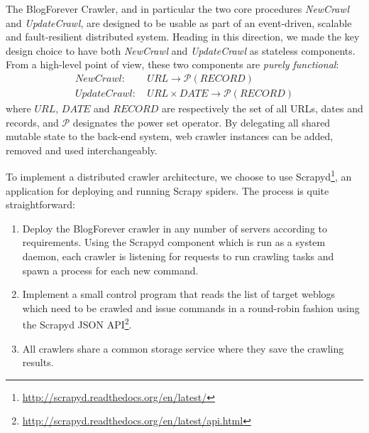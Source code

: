 The BlogForever Crawler, and in particular the two core procedures 
\emph{NewCrawl} and \emph{UpdateCrawl}, are designed to be usable as 
part of an event-driven, scalable and fault-resilient distributed system. 
Heading in this direction, we made the key design choice to have 
both \emph{NewCrawl} and \emph{UpdateCrawl} as stateless components. 
From a high-level point of view, these two components are \emph{purely functional}:
%
\begin{eqnarray*}
NewCrawl:    &~ URL \rightarrow \mathcal{P}(RECORD) \\
UpdateCrawl: &~ URL \times DATE \rightarrow \mathcal{P}(RECORD)
\end{eqnarray*}
%
where $URL$, $DATE$ and $RECORD$ are respectively the set of all URLs, 
dates and records, and $\mathcal{P}$ designates the power set operator. 
By delegating all shared mutable state to the back-end system, 
web crawler instances can be added, removed and used interchangeably.

To implement a distributed crawler architecture, we choose to use 
Scrapyd\footnote{\url{http://scrapyd.readthedocs.org/en/latest/}}, 
an application for deploying and running Scrapy spiders. 
The process is quite straightforward:

\begin{enumerate}
\item 
Deploy the BlogForever crawler in any number of servers according 
to requirements. Using the Scrapyd component which is run as a system 
daemon, each crawler is listening for requests to run crawling tasks 
and spawn a process for each new command.
\item 
Implement a small control program that reads the list of target weblogs 
which need to be crawled and issue commands in a round-robin fashion 
using the Scrapyd JSON 
API\footnote{\url{http://scrapyd.readthedocs.org/en/latest/api.html}}. 
\item 
All crawlers share a common storage service where they save the crawling 
results. 
\end{enumerate}

